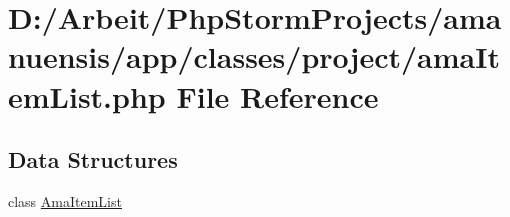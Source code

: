 \hypertarget{a00099}{}\section{D\+:/\+Arbeit/\+Php\+Storm\+Projects/amanuensis/app/classes/project/ama\+Item\+List.php File Reference}
\label{a00099}
\subsection*{Data Structures}
\begin{DoxyCompactItemize}
\item 
class \hyperlink{a00005}{Ama\+Item\+List}
\end{DoxyCompactItemize}
